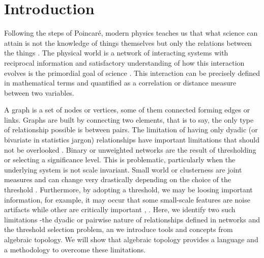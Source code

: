\documentclass[onecollarge,runningheads]{svjour2}
\begin{document}
\section{Introduction}

Following the steps of Poincar{\'e}, modern physics teaches us that what science can attain is not the knowledge of things themselves but only the relations between the things \cite{Poincare:1952}. The physical world is a network of interacting systems with reciprocal information and satisfactory understanding of how this interaction evolves is the primordial goal of science \cite{rovelli2015relative}.
This interaction can be precisely defined in mathematical terms and quantified as a correlation or distance measure between two variables. 

A graph is a set of nodes or vertices, some of them connected forming edges or links. Graphs are built by connecting two elements, that is to say, the only type of relationship possible is between pairs. The limitation of having only dyadic (or bivariate in statistics jargon) relationships have important limitations that should not be overlooked \cite{giusti2016two}. 
Binary or unweighted networks are the result of thresholding or selecting a significance level. This is problematic, particularly when the underlying system is not scale invariant. Small world or clusterness are joint measures and can change very drastically depending on the choice of the threshold \cite{toppi2012statistical}. Furthermore, by adopting a threshold, we may be loosing important information, for example, it may occur that some small-scale features are noise artifacts while other are critically important \cite{fallani2014graph}, \cite{papo2014complex}.
Here, we identify two such limitations -the dyadic or pairwise nature of relationships defined in networks and the threshold selection problem, an we introduce tools and concepts from algebraic topology.
We will show that algebraic topology \cite{munkres1984elements} provides a language and a methodology to overcome these limitations. 
\end{document}
